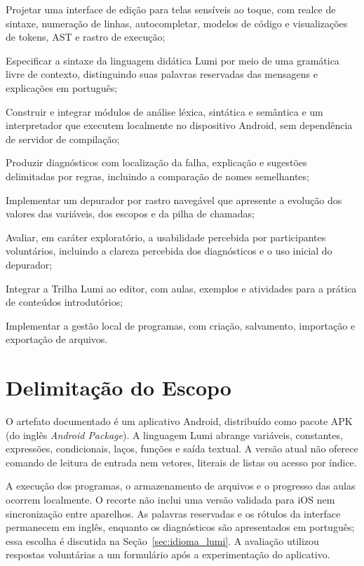 \documentclass[
    12pt
    ,oneside
    ,a4paper
    ,chapter=TITLE
    ,section=TITLE
    ,sumario=abnt-6027-2012]{abntex2}
\begin{document}
\begin{alineas}
    \item Projetar uma interface de edição para telas sensíveis ao toque, com realce de sintaxe, numeração de linhas, autocompletar, modelos de código e visualizações de tokens, AST e rastro de execução;
    \item Especificar a sintaxe da linguagem didática Lumi por meio de uma gramática livre de contexto, distinguindo suas palavras reservadas das mensagens e explicações em português;
    \item Construir e integrar módulos de análise léxica, sintática e semântica e um interpretador que executem localmente no dispositivo Android, sem dependência de servidor de compilação;
    \item Produzir diagnósticos com localização da falha, explicação e sugestões delimitadas por regras, incluindo a comparação de nomes semelhantes;
    \item Implementar um depurador por rastro navegável que apresente a evolução dos valores das variáveis, dos escopos e da pilha de chamadas;
    \item Avaliar, em caráter exploratório, a usabilidade percebida por participantes voluntários, incluindo a clareza percebida dos diagnósticos e o uso inicial do depurador;
    \item Integrar a Trilha Lumi ao editor, com aulas, exemplos e atividades para a prática de conteúdos introdutórios;
    \item Implementar a gestão local de programas, com criação, salvamento, importação e exportação de arquivos.
\end{alineas}

\section{Delimitação do Escopo}
\label{sec:escopo}

O artefato documentado é um aplicativo Android, distribuído como pacote
APK (do inglês \textit{Android Package}). A linguagem Lumi abrange
variáveis, constantes, expressões, condicionais, laços, funções e saída textual.
A versão atual não oferece comando de leitura de entrada nem vetores, literais de listas ou acesso por índice.

A execução dos programas, o armazenamento de arquivos e o progresso das aulas
ocorrem localmente. O recorte não inclui uma versão validada para iOS nem
sincronização entre aparelhos. As palavras reservadas e os rótulos da interface permanecem em inglês, enquanto os diagnósticos são apresentados em português; essa escolha é discutida na Seção~\ref{sec:idioma_lumi}. A avaliação utilizou respostas voluntárias a um formulário após a experimentação do aplicativo.
\end{document}

